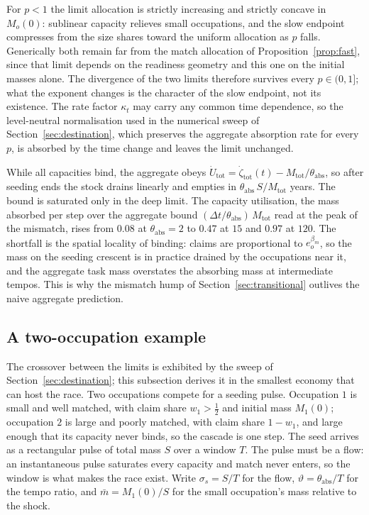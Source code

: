 \documentclass[12pt, a4paper]{article}
\begin{document}
For $p < 1$ the limit allocation is strictly increasing and strictly
concave in $M_o(0)$: sublinear capacity relieves small occupations, and
the slow endpoint compresses from the size shares toward the uniform
allocation as $p$ falls. Generically both remain far from the match
allocation of Proposition~\ref{prop:fast}, since that limit depends on
the readiness geometry and this one on the initial masses alone. The
divergence of the two limits therefore survives every
$p \in (0,1]$; what the exponent changes is the character of the slow
endpoint, not its existence. The rate factor $\kappa_t$ may carry any
common time dependence, so the level-neutral normalisation used in the
numerical sweep of Section~\ref{sec:destination}, which preserves the
aggregate absorption rate for every $p$, is absorbed by the time change
and leaves the limit unchanged.

While all capacities bind, the aggregate obeys
$\dot U_{\text{tot}} = \dot\zeta_{\text{tot}}(t) - M_{\text{tot}}/\theta_{\text{abs}}$,
so after seeding ends the stock drains linearly and empties in
$\theta_{\text{abs}}\, S/M_{\text{tot}}$ years. The bound is saturated
only in the deep limit. The capacity utilisation, the mass absorbed
per step over the aggregate bound
$(\Delta t/\theta_{\text{abs}})\,M_{\text{tot}}$ read at the peak of
the mismatch, rises from $0.08$ at $\theta_{\text{abs}} = 2$ to $0.47$
at $15$ and $0.97$ at $120$. The shortfall is the spatial locality of
binding: claims are proportional to $e_o^{\beta_m}$, so the mass on the
seeding crescent is in practice drained by the occupations near it, and
the aggregate task mass overstates the absorbing mass at intermediate
tempos. This is why the mismatch hump of
Section~\ref{sec:transitional} outlives the naive aggregate prediction.

\subsection{A two-occupation example}
\label{sec:two-occ}

The crossover between the limits is exhibited by the sweep of
Section~\ref{sec:destination}; this subsection derives it in the
smallest economy that can host the race. Two occupations compete for a
seeding pulse. Occupation $1$ is small and well matched, with claim
share $w_1 > \tfrac12$ and initial mass $M_1(0)$; occupation $2$ is
large and poorly matched, with claim share $1 - w_1$, and large enough
that its capacity never binds, so the cascade is one step. The seed
arrives as a rectangular pulse of total mass $S$ over a window $T$. The
pulse must be a flow: an instantaneous pulse saturates every capacity
and match never enters, so the window is what makes the race exist.
Write $\sigma_s = S/T$ for the flow, $\vartheta = \theta_{\text{abs}}/T$ for
the tempo ratio, and $\bar m = M_1(0)/S$ for the small occupation's mass
relative to the shock.
\end{document}
